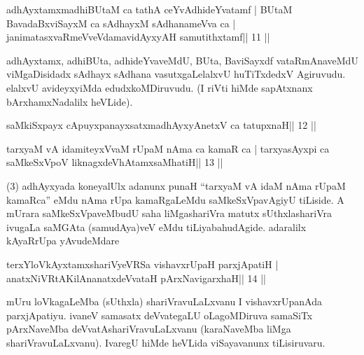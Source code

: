 
\begin{shl}
adhAyxtamxmadhiBUtaM ca tathA ceYvAdhideYvatamf |
BUtaM BavadaBxviSayxM ca sAdhayxM sAdhanameVva ca |
janimatasxvaRmeVveVdamavidAyxyAH samutithxtamf\hfill || 11 ||
\end{shl}

\begin{artha}
adhAyxtamx, adhiBUta, adhideYvaveMdU, BUta, BaviSayxdf vataRmAnaveMdU 
viMgaDisidadx sAdhayx sAdhana vasutxgaLelalxvU huTiTxdedxV Agiruvudu. elalxvU avideyxyiMda edudxkoMDiruvudu. (I riVti hiMde sapAtxnanx bArxhamxNadalilx heVLide).
\end{artha} 


\begin{shl}
saMkiSxpayx cApuyxpanayxsatxmadhAyxyAnetxV ca tatupxnaH\hfill || 12 ||
\end{shl}

\begin{shl}
tarxyaM vA idamiteyxVvaM rUpaM nAma ca kamaR ca |
tarxyasAyxpi ca saMkeSxVpoV liknagxdeVhAtamxsaMhatiH\hfill || 13 ||
\end{shl}

\begin{artha}
(3) adhAyxyada koneyalUlx adanunx punaH ``tarxyaM vA idaM nAma rUpaM 
kamaRca'' eMdu nAma rUpa kamaRgaLeMdu saMkeSxVpavAgiyU tiLiside. A mUrara saMkeSxVpaveMbudU saha liMgashariVra matutx sUthxlashariVra ivugaLa saMGAta (samudAya)veV eMdu tiLiyabahudAgide. adaralilx kAyaRrUpa yAvudeMdare  \mdash 
\end{artha}

\begin{shl}
terxYloVkAyxtamxshariVyeVRSa vishavxrUpaH parxjApatiH |
anatxNiVRtAKilAnanatxdeVvataH pArxNavigarxhaH\hfill || 14 ||
\end{shl}

\begin{artha}
mUru loVkagaLeMba (sUthxla) shariVravuLaLxvanu I vishavxrUpanAda\break 
parxjApatiyu. ivaneV samasatx deVvategaLU oLagoMDiruva samaSiTx pArxNaveMba deVvatAshariVravuLaLxvanu (karaNaveMba liMga shariVravuLaLxvanu). IvaregU hiMde heVLida viSayavanunx tiLisiruvaru.
\end{artha} 




